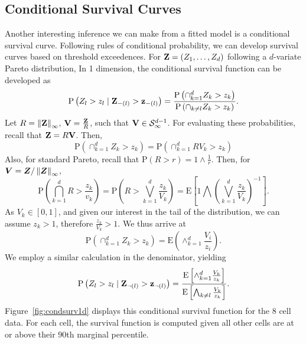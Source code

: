 \subsection{Conditional Survival Curves}
Another interesting inference we can make from a fitted model is a conditional survival curve.
  Following rules of conditional probability, we can develop survival curves based on
  threshold exceedences. For ${\bf Z} = (Z_1,\ldots,Z_d)$ following a $d$-variate Pareto distribution,
  In 1 dimension, the conditional survival function can be developed as
  \begin{equation}
    \label{eqn:condsurv1d}
    \text{P}\left(Z_l > z_l\mid {\bf Z}_{-(l)} > {\bf z}_{-(l)}\right) =
      \frac{\text{P}\left(\cap_{k = 1}^d Z_k > z_k\right)}{\text{P}\left(\cap_{k \neq l} Z_k > z_k\right)}.
  \end{equation}
  Let $R = \left\lVert {\bf Z} \right\rVert_{\infty}$, ${\bf V} = \frac{{\bf Z}}{R}$, such that ${\bf V}\in \mathcal{S}_{\infty}^{d-1}$.
  For evaluating these probabilities, recall that ${\bf Z} = R{\bf V}$.  Then,
  \begin{equation}
    \text{P}\left(\cap_{k = 1}^d Z_k > z_k\right) = \text{P}\left(\cap_{k = 1}^d RV_k > z_k\right)
  \end{equation}
  Also, for standard Pareto, recall that $\text{P}(R > r) = 1\wedge\frac{1}{r}$.
  Then, for $\bm{V} = \bm{Z} / \left\lVert \bm{Z} \right\rVert_{\infty}$,
  \begin{equation}
    \text{P}\left(\bigcap_{k = 1}^d R > \frac{z_k}{v_k}\right) =
      \text{P}\left(R  > \bigvee_{k=1}^d\frac{z_k}{V_k}\right) =
      \text{E}\left[1 \bigwedge \left(\bigvee_{k = 1}^d\frac{z_k}{V_k}\right)^{-1}\right].
  \end{equation}
  As $V_k \in [0,1]$, and given our interest in the tail of the distribution, we can assume $z_k > 1$,
  therefore $\frac{z_k}{V_k} > 1$.  We thus arrive at
  \begin{equation}
    \text{P}\left(\cap_{k = 1}^dZ_k > z_k\right) = \text{E}\left(\wedge_{k = 1}^d\frac{V_i}{z_i}\right).
  \end{equation}
  We employ a similar calculation in the denominator, yielding
  \begin{equation}
    \label{eqn:condsurv1df}
    \text{P}\left(Z_l > z_l\mid {\bf Z}_{\neg(l)} > {\bf z}_{\neg(l)}\right) =
      \frac{\text{E}\left[\wedge_{k = 1}^d \frac{V_k}{z_k}\right]}{\text{E}\left[\bigwedge_{k \neq l}\frac{V_k}{z_k}\right]}.
  \end{equation}
  Figure~\ref{fig:condsurv1d} displays this conditional survival function for the 8 cell data. For each
  cell, the survival function is computed given all other cells are at or above their $90$th marginal
  percentile.

